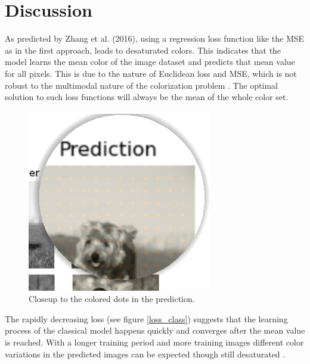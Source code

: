 \documentclass[12pt,letterpaper]{article}
\begin{document}
\section{Discussion}
As predicted by Zhang et al. (2016), using a regression loss function like the MSE as in the first approach, leads to desaturated colors. This indicates that the model learns the mean color of the image dataset and predicts that mean value for all pixels. This is due to the nature of Euclidean loss and MSE, which is not robust to the multimodal nature of the colorization problem \citep{Zhang.2016}. The optimal solution to such loss functions will always be the mean of the whole color set.\\
\begin{figure}
	\centering
	\includegraphics[width=.40\textwidth]{dots.png}
	\caption{Closeup to the colored dots in the prediction.}
	\label{dots}
\end{figure}
The rapidly decreasing loss (see figure \ref{loss_class}) suggests that the learning process of the classical model happens quickly and converges after the mean value is reached. With a longer training period and more training images different color variations in the predicted images can be expected though still desaturated \citep{Zhang.2016}.\\
\end{document}
